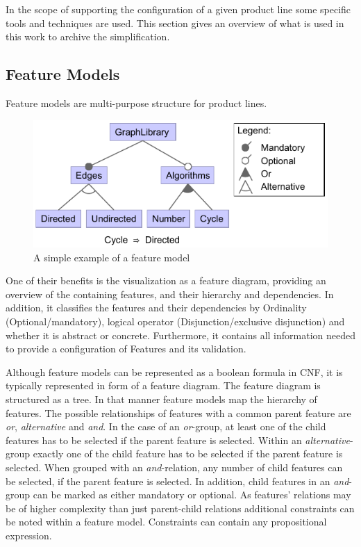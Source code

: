 In the scope of supporting the configuration of a given product line some specific tools and techniques are used. This section gives an overview of what is used in this work to archive the simplification.

\subsection{Feature Models}
Feature models are multi-purpose structure for product lines. 
\begin{figure}
	\includegraphics{img/img-fm.pdf}
	\caption{A simple example of a feature model}
	\label{img-fm}
\end{figure}
One of their benefits is the visualization as a feature diagram, providing an overview of the containing features, and their hierarchy and dependencies. In addition, it classifies the features and their dependencies by Ordinality (Optional/mandatory), logical operator (Disjunction/exclusive disjunction) and whether it is abstract or concrete. Furthermore, it contains all information needed to provide a configuration of Features and its validation.

Although feature models can be represented as a boolean formula in CNF, it is typically represented in form of a feature diagram. The feature diagram is structured as a tree. In that manner feature models map the hierarchy of features. The possible relationships of features with a common parent feature are \textit{or}, \textit{alternative} and \textit{and}. In the case of an \textit{or}-group, at least one of the child features has to be selected if the parent feature is selected. Within an \textit{alternative}-group exactly one of the child feature has to be selected if the parent feature is selected. When grouped with an \textit{and}-relation, any number of child features can be selected, if the parent feature is selected. In addition, child features in an \textit{and}-group can be marked as either mandatory or optional.  As features' relations may be of higher complexity than just parent-child relations additional constraints can be noted within a feature model. Constraints can contain any propositional expression.

